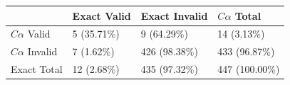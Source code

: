\begin{tabular}{llll}
\toprule
 & Exact Valid & Exact Invalid & $C\alpha$ Total \\
\midrule
$C\alpha$ Valid & 5 (35.71\%) & 9 (64.29\%) & 14 (3.13\%) \\
$C\alpha$ Invalid & 7 (1.62\%) & 426 (98.38\%) & 433 (96.87\%) \\
Exact Total & 12 (2.68\%) & 435 (97.32\%) & 447 (100.00\%) \\
\bottomrule
\end{tabular}
